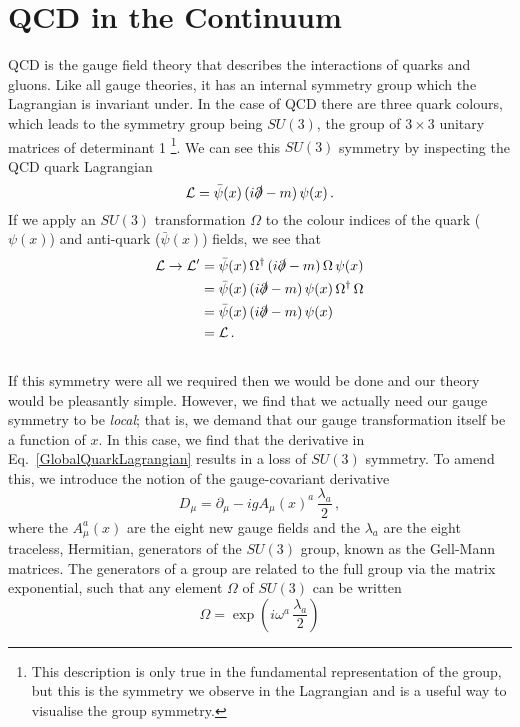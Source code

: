 \section{QCD in the Continuum}
QCD is the gauge field theory that describes the interactions of quarks and gluons. Like all gauge theories, it has an internal symmetry group which the Lagrangian is invariant under. In the case of QCD there are three quark colours, which leads to the symmetry group being $SU(3)$, the group of $3\times 3$ unitary matrices of determinant 1 \footnote{This description is only true in the fundamental representation of the group, but this is the symmetry we observe in the Lagrangian and is a useful way to visualise the group symmetry.}. We can see this $SU(3)$ symmetry by inspecting the QCD quark Lagrangian
%
\begin{equation}
\mathcal{L} = \bar{\psi}(x)\,(i\slashed{\partial}-m)\,\psi(x)\,.
\label{GlobalQuarkLagrangian}
\end{equation}
%
If we apply an $SU(3)$ transformation $\Omega$ to the colour indices of the quark ($\psi (x)$) and anti-quark ($\bar{\psi} (x)$) fields, we see that
%
\begin{align*}
\mathcal{L}\rightarrow\mathcal{L'}&=\bar{\psi}(x)\,\Omega^\dag\,(i\slashed{\partial}-m)\,\Omega\,\psi(x)\\
&= \bar{\psi}(x)\,(i\slashed{\partial}-m)\,\psi(x)\,\Omega^\dag\,\Omega\\
&= \bar{\psi}(x)\,(i\slashed{\partial}-m)\,\psi(x)\\
&= \mathcal{L}\, .
\end{align*}\\
%
If this symmetry were all we required then we would be done and our theory would be pleasantly simple. However, we find that we actually need our gauge symmetry to be \textit{local}; that is, we demand that our gauge transformation itself be a function of $x$\cite{peskin2018introduction}. In this case, we find that the derivative in Eq.~\ref{GlobalQuarkLagrangian} results in a loss of $SU(3)$ symmetry. To amend this, we introduce the notion of the gauge-covariant derivative
%
\begin{equation}
D_\mu = \partial_\mu - ig A_\mu(x)^a\,\frac{\lambda_a}{2}\, ,
\end{equation}
%
where the $A_\mu^a(x)$ are the eight new gauge fields and the $\lambda_a$ are the eight traceless, Hermitian, generators of the $SU(3)$ group, known as the Gell-Mann matrices. The generators of a group are related to the full group via the matrix exponential, such that any element $\Omega$ of $SU(3)$ can be written
\begin{equation}
\Omega = \exp\left(i\omega^a\,\frac{\lambda_a}{2}\right)
\end{equation}


